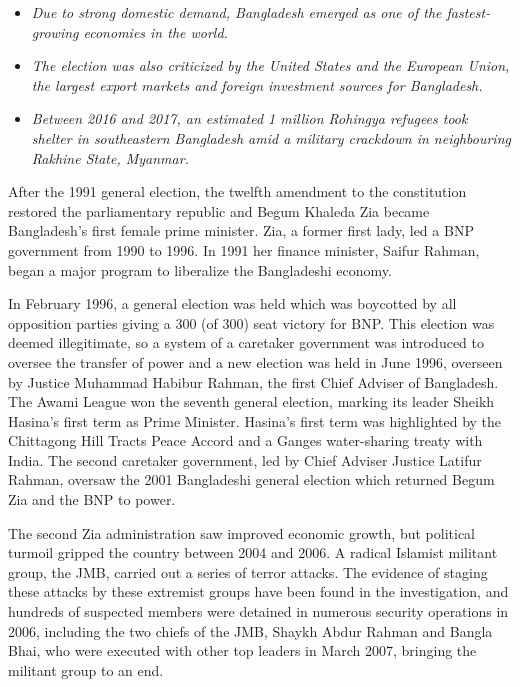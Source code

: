 \begin{itemize}
\item
  \emph{Due to strong domestic demand, Bangladesh emerged as one of the
  fastest-growing economies in the world.}
\item
  \emph{The election was also criticized by the United States and the
  European Union, the largest export markets and foreign investment
  sources for Bangladesh.}
\item
  \emph{Between 2016 and 2017, an estimated 1 million Rohingya refugees
  took shelter in southeastern Bangladesh amid a military crackdown in
  neighbouring Rakhine State, Myanmar.}
\end{itemize}

After the 1991 general election, the twelfth amendment to the
constitution restored the parliamentary republic and Begum Khaleda Zia
became Bangladesh's first female prime minister. Zia, a former first
lady, led a BNP government from 1990 to 1996. In 1991 her finance
minister, Saifur Rahman, began a major program to liberalize the
Bangladeshi economy.

In February 1996, a general election was held which was boycotted by all
opposition parties giving a 300 (of 300) seat victory for BNP. This
election was deemed illegitimate, so a system of a caretaker government
was introduced to oversee the transfer of power and a new election was
held in June 1996, overseen by Justice Muhammad Habibur Rahman, the
first Chief Adviser of Bangladesh. The Awami League won the seventh
general election, marking its leader Sheikh Hasina's first term as Prime
Minister. Hasina's first term was highlighted by the Chittagong Hill
Tracts Peace Accord and a Ganges water-sharing treaty with India. The
second caretaker government, led by Chief Adviser Justice Latifur
Rahman, oversaw the 2001 Bangladeshi general election which returned
Begum Zia and the BNP to power.

The second Zia administration saw improved economic growth, but
political turmoil gripped the country between 2004 and 2006. A radical
Islamist militant group, the JMB, carried out a series of terror
attacks. The evidence of staging these attacks by these extremist groups
have been found in the investigation, and hundreds of suspected members
were detained in numerous security operations in 2006, including the two
chiefs of the JMB, Shaykh Abdur Rahman and Bangla Bhai, who were
executed with other top leaders in March 2007, bringing the militant
group to an end.

